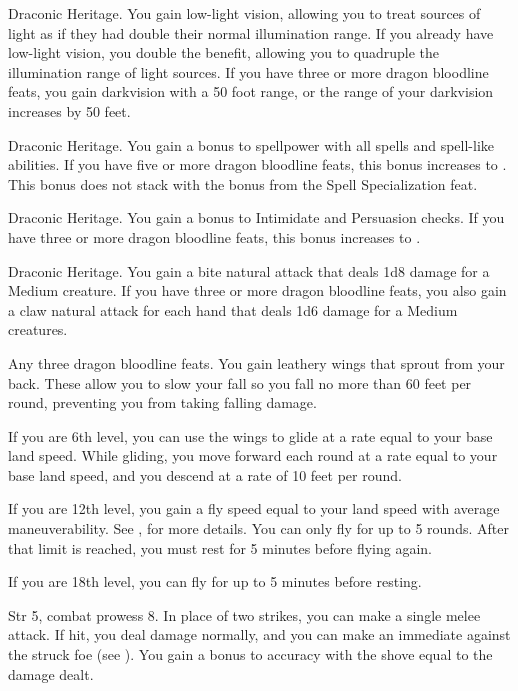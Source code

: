 \featpre Draconic Heritage.
\featben You gain low-light vision, allowing you to treat sources of light as if they had double their normal illumination range.
If you already have low-light vision, you double the benefit, allowing you to quadruple the illumination range of light sources.
If you have three or more dragon bloodline feats, you gain darkvision with a 50 foot range, or the range of your darkvision increases by 50 feet.

\featpre Draconic Heritage.
\featben You gain a  bonus to spellpower with all spells and spell-like abilities.
If you have five or more dragon bloodline feats, this bonus increases to .
This bonus does not stack with the bonus from the Spell Specialization feat.

\featpre Draconic Heritage.
\featben You gain a  bonus to Intimidate and Persuasion checks.
If you have three or more dragon bloodline feats, this bonus increases to .

\featpre Draconic Heritage.
\featben You gain a bite natural attack that deals 1d8 damage for a Medium creature.
If you have three or more dragon bloodline feats, you also gain a claw natural attack for each hand that deals 1d6 damage for a Medium creatures.

\featpre Any three dragon bloodline feats.
\featben You gain leathery wings that sprout from your back.
These allow you to slow your fall so you fall no more than 60 feet per round, preventing you from taking falling damage.

If you are 6th level, you can use the wings to glide at a rate equal to your base land speed.
While gliding, you move forward each round at a rate equal to your base land speed, and you descend at a rate of 10 feet per round.

If you are 12th level, you gain a fly speed equal to your land speed with average maneuverability.
See , for more details.
You can only fly for up to 5 rounds.
After that limit is reached, you must rest for 5 minutes before flying again.

If you are 18th level, you can fly for up to 5 minutes before resting.

\featpres Str 5, combat prowess 8.
\featben In place of two strikes, you can make a single melee attack.
If hit, you deal damage normally, and you can make an immediate  against the struck foe (see ).
You gain a bonus to accuracy with the shove equal to the damage dealt.

